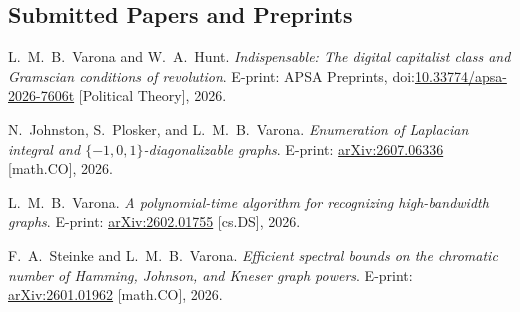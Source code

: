 \documentclass[letterpaper,11pt]{article}
\begin{document}
\vspace{-0.2in}\subsection*{Submitted Papers and Preprints}
\begin{revnumerate}
\setlength{\itemsep}{1pt}


\item
	L.~M.~B.~Varona and W.~A.~Hunt. \emph{Indispensable: The digital capitalist class and Gramscian conditions of revolution}. E-print: APSA Preprints, doi:\hyperref{https://doi.org/10.33774/apsa-2026-7606t}{}{}{10.33774/apsa-2026-7606t} [Political Theory], 2026.

\item
	N.~Johnston, S.~Plosker, and L.~M.~B.~Varona. \emph{Enumeration of Laplacian integral and $\{-1,0,1\}$-diagonalizable graphs}. E-print: \hyperref{https://doi.org/10.48550/arXiv.2607.06336}{}{}{arXiv:2607.06336} [math.CO], 2026.

\item
	L.~M.~B.~Varona. \emph{A polynomial-time algorithm for recognizing high-bandwidth graphs}. E-print: \hyperref{https://doi.org/10.48550/arXiv.2602.01755}{}{}{arXiv:2602.01755} [cs.DS], 2026.

\item
	F.~A.~Steinke and L.~M.~B.~Varona. \emph{Efficient spectral bounds on the chromatic number of Hamming, Johnson, and Kneser graph powers}. E-print: \hyperref{https://doi.org/10.48550/arXiv.2601.01962}{}{}{arXiv:2601.01962} [math.CO], 2026.
\end{revnumerate}\vspace*{-2pt}
\end{document}
